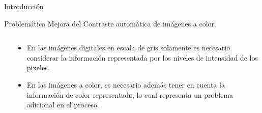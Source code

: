\documentclass[usenames,dvipsnames]{beamer}
\begin{document}


\begin{frame}{Introducción}
\begin{alertblock}{Problemática}
Mejora del Contraste automática de imágenes a color.
\end{alertblock}

\begin{columns}[t]
\begin{column}{.3\textwidth}

\end{column}
\begin{column}{.7\textwidth}
\begin{itemize}
	\item En las imágenes digitales en escala de gris solamente es necesario considerar la información representada por los niveles de intensidad de los pixeles.
	\item En las imágenes a color, es necesario además tener en cuenta la información de color representada, lo cual representa un problema adicional en el proceso.
\end{itemize}
\end{column}
\end{columns}
\end{frame}
\end{document}
